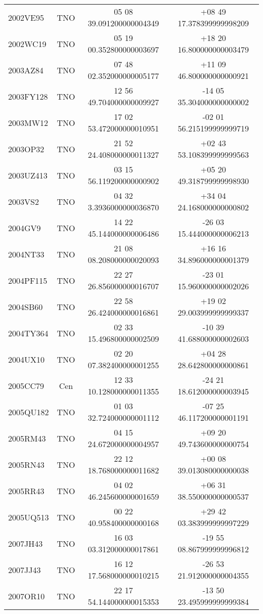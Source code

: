 \documentclass[a4paper, 11pt]{article}
\begin{document}
\begin{table}[!h]
\begin{center}
{\begin{tabular}{|l|c|c|c|}
2002VE95    &  TNO &  05 08 39.091200000004349 & +08 49 17.378399999998209 \\
2002WC19    &  TNO &  05 19 00.352800000003697 & +18 20 16.800000000003479 \\
2003AZ84    &  TNO &  07 48 02.352000000005177 & +11 09 46.800000000000921 \\
2003FY128   &  TNO &  12 56 49.704000000009927 & -14 05 35.304000000000002 \\
2003MW12    &  TNO &  17 02 53.472000000010951 & -02 01 56.215199999999719 \\
2003OP32    &  TNO &  21 52 24.408000000011327 & +02 43 53.108399999999563 \\
2003UZ413   &  TNO &  03 15 56.119200000000902 & +05 20 49.318799999998930 \\
2003VS2     &  TNO &  04 32 3.3936000000036870 & +34 04 24.168000000000802 \\
2004GV9     &  TNO &  14 22 45.144000000006486 & -26 03 15.444000000006213 \\
2004NT33    &  TNO &  21 08 08.208000000020093 & +16 16 34.896000000001379 \\
2004PF115   &  TNO &  22 27 26.856000000016707 & -23 01 15.960000000002026 \\
2004SB60    &  TNO &  22 58 26.424000000016861 & +19 02 29.003999999999337 \\
2004TY364   &  TNO &  02 33 15.496800000002509 & -10 39 41.688000000002603 \\
2004UX10    &  TNO &  02 20 07.382400000001255 & +04 28 28.642800000000861 \\
2005CC79    &  Cen &  12 33 10.128000000011355 & -24 21 18.612000000003945 \\
2005QU182   &  TNO &  01 03 32.724000000001112 & -07 25 46.117200000001191 \\
2005RM43    &  TNO &  04 15 24.672000000004957 & +09 20 49.743600000000754 \\
2005RN43    &  TNO &  22 12 18.768000000011682 & +00 08 39.013080000000038 \\
2005RR43    &  TNO &  04 02 46.245600000001659 & +06 31 38.550000000000537 \\
2005UQ513   &  TNO &  00 22 40.958400000000168 & +29 42 03.383999999997229 \\
2007JH43    &  TNO &  16 03 03.312000000017861 & -19 55 08.867999999996812 \\
2007JJ43    &  TNO &  16 12 17.568000000010215 & -26 53 21.912000000004355 \\
2007OR10    &  TNO &  22 17 54.144000000015353 & -13 50 23.495999999999384 \\

\end{tabular}}
\end{center}
\end{table}
\end{document}

